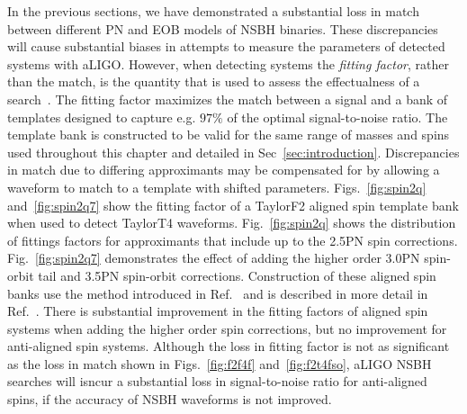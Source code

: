 In the previous sections, we have demonstrated a substantial loss in match between
different \ac{PN} and EOB models of \ac{NSBH} binaries. These discrepancies
will cause substantial biases in attempts to measure the parameters of
detected systems with aLIGO. However, when detecting systems the
\emph{fitting factor}, rather than the match, is the quantity that is used to
assess the effectualness of a search~\cite{Apostolatos:1996rf}. The fitting
factor maximizes the match between a signal and a bank of templates designed
to capture e.g. $97\%$ of the optimal signal-to-noise ratio. The template bank is constructed to be 
valid for the same range of masses and spins used
throughout this chapter and detailed in Sec~\ref{sec:introduction}. Discrepancies in
match due to differing approximants may be compensated for by allowing a waveform
to match to a template with shifted parameters.
Figs.~\ref{fig:spin2q} and~\ref{fig:spin2q7} show the fitting
factor of a TaylorF2 aligned spin template bank when used to detect TaylorT4
waveforms. Fig.~\ref{fig:spin2q} shows the distribution of fittings factors for approximants that include up to the 2.5\ac{PN} 
spin corrections. Fig.~\ref{fig:spin2q7} demonstrates the effect of adding the higher order
3.0\ac{PN} spin-orbit tail and 3.5\ac{PN} spin-orbit corrections.
Construction of these aligned spin banks use the method introduced
in Ref.~\cite{Brown:2012qf} and is described in more detail in Ref.~\cite{Harry:2013tca}.
There is substantial improvement in the fitting factors of aligned spin systems when
adding the higher order spin corrections, but no improvement for anti-aligned spin systems. 
Although the loss in fitting factor is not as significant as the loss in match shown in
Figs.~\ref{fig:f2f4f} and~\ref{fig:f2t4fso}, aLIGO \ac{NSBH} searches will isncur a substantial loss in 
signal-to-noise ratio for anti-aligned spins, if the accuracy of \ac{NSBH} waveforms is not improved. 

